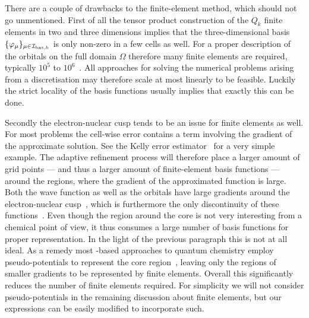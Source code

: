 There are a couple of drawbacks to the finite-element method,
which should not go unmentioned.
First of all the tensor product construction of the $Q_k$ finite elements
in two and three dimensions
implies that
the three-dimensional \FE basis $\{\varphi_\mu\}_{\mu\in\mathcal{I}_{\text{bas},h}}$
is only non-zero in a few cells as well.
For a proper description of the \HF orbitals
on the full domain $\Omega$
therefore many finite elements are required,
typically $10^5$ to $10^6$~\cite{Davydov2015}.
All approaches for solving the numerical problems arising from a \FE
discretisation may therefore scale at most linearly to be feasible.
Luckily the strict locality of the \FE basis functions
usually implies that exactly this can be done.

Secondly the electron-nuclear cusp tends to be an issue
for finite elements as well.
For most problems the cell-wise error contains
a term involving the gradient of the approximate solution.
See the Kelly error estimator~\cite{KellyError} for a very simple example.
The adaptive refinement process
will therefore place a larger amount of grid points
--- and thus a larger amount of finite-element basis functions ---
around the regions,
where the gradient of the approximated function is large.
Both the wave function as well as the \HF orbitals
have large gradients around the electron-nuclear cusp~\cite{Kato1957},
which is furthermore the only discontinuity of these
functions~\cite{Kato1951}.
Even though the region around the core
is not very interesting from a chemical point of view,
it thus consumes a large number of \FE basis functions
for proper representation.
In the light of the previous paragraph this is not at all ideal.
As a remedy most \FE-based approaches to quantum chemistry employ pseudo-potentials
to represent the core region~\cite{Davydov2015},
leaving only the regions of smaller gradients
to be represented by finite elements.
Overall this significantly reduces the number of finite elements required.
For simplicity we will not consider pseudo-potentials
in the remaining discussion about finite elements,
but our expressions can be easily modified to incorporate such.

